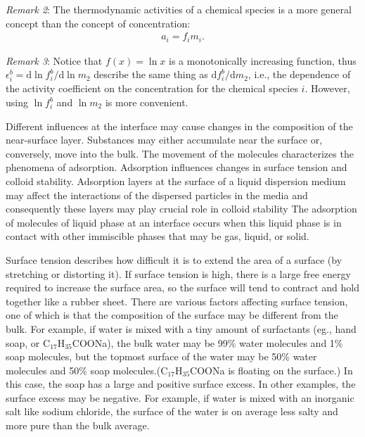 \emph{Remark 2}: The thermodynamic activities of a chemical species is a more general concept than the concept of concentration:
\begin{eqnarray}
\label{c4}
a_i= f_im_i.
\end{eqnarray}

\emph{Remark 3}: Notice that $f(x)=\ln x$ is a monotonically increasing function, thus $\epsilon_i^b=\mathrm{d}\ln f_i^{b}/\mathrm{d}\ln m_2$ 
describe the same thing as $\mathrm{d}f_i^{b}/\mathrm{d}m_2$, i.e., the dependence of the activity coefficient on the 
concentration for the chemical species $i$. However, using $\ln f_i^{b}$ and $\ln m_2$ is more convenient.

Different influences at the interface may cause changes in the composition of the near-surface layer. 
Substances may either accumulate near the surface or, conversely, move into the bulk. The movement of the molecules 
characterizes the phenomena of adsorption. Adsorption influences changes in surface tension and colloid stability. 
Adsorption layers at the surface of a liquid dispersion medium may affect the interactions of the dispersed particles 
in the media and consequently these layers may play crucial role in colloid stability The adsorption of molecules of 
liquid phase at an interface occurs when this liquid phase is in contact with other immiscible phases that may be gas, liquid, or solid.

Surface tension describes how difficult it is to extend the area of a surface (by stretching or distorting it).
If surface tension is high, there is a large free energy required to increase the surface area,
so the surface will tend to contract and hold together like a rubber sheet.
There are various factors affecting surface tension, one of which is that the composition of the surface may
be different from the bulk. For example, if water is mixed with a tiny amount of surfactants (eg., hand soap, or C$_{17}$H$_{35}$COONa),
the bulk water may be 99\% water molecules and 1\% soap molecules, but the topmost surface of the water may be 50\% water molecules
and 50\% soap molecules.(C$_{17}$H$_{35}$COONa is floating on the surface.) In this case, the soap has a large and positive {surface excess}.
In other examples, the surface excess may be negative. For example, if water is mixed with an inorganic salt like sodium chloride, 
the surface of the water is on average less salty and more pure than the bulk average.

